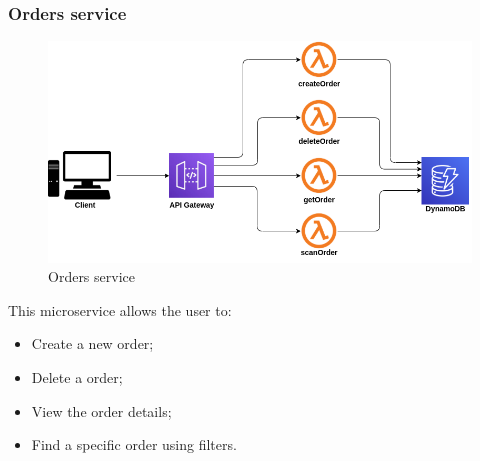 \subsubsection{Orders service}
\begin{figure}[!h]
    \vspace{5px}
    \includegraphics[scale=0.5]{../../../../Images/Diagrammi/maintainerManual/orderService.png}
    \centering
    \caption{Orders service}
\end{figure}
This microservice allows the user to:
\begin{itemize}
    \item Create a new order;
    \item Delete a order;
    \item View the order details;
    \item Find a specific order using filters.
\end{itemize}
\pagebreak
